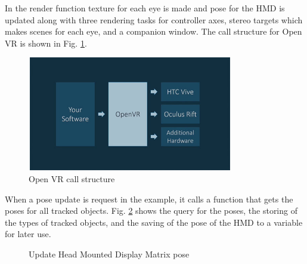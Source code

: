 \documentclass[journal]{IEEEtran}
\begin{document}
In the render function texture for each eye is made and pose for the HMD is updated along with three rendering tasks for controller axes, stereo targets which makes scenes for each eye, and a companion window. The call structure for Open VR is shown in Fig. \ref{fig:openvr_1}.

\begin{figure}[t]
	\includegraphics[width=9cm, height=5cm]{openvr_1} 
	\centering
	\caption{Open VR call structure \label{fig:openvr_1} \cite{openVR_fn_images}}
\end{figure}

When a pose update is request in the example, it calls a function that gets the poses for all tracked objects. Fig. \ref{fig:hellovrfn} shows the query for the poses, the storing of the types of tracked objects, and the saving of the pose of the HMD to a variable for later use. 
	

	\begin{figure}[h]
		\noindent
		
		\caption{Update Head Mounted Display Matrix pose \label{fig:hellovrfn}
		}
	\end{figure}
	
\end{document}

